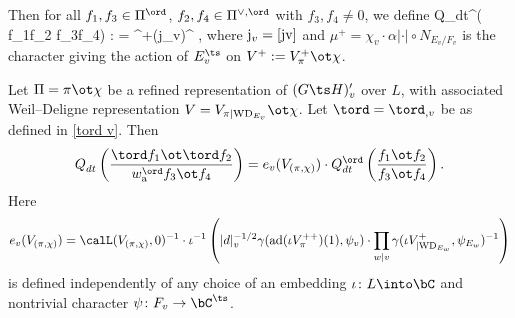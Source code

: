 Then for all $f_{1}, f_{3}\in \Pi^{\ord}$, $f_{2},f_{4}\in \Pi^{\vee, \ord}$ with $f_{3}, f_{4}\neq 0$, we define
\beq {}
Q_{dt}^{\ord}\left( {f_{1}\ot f_{2} \over f_{3}\ot f_{4}}\right)   : =  \mu^{+}({\rm j}_{v})^{} ,
\eeq
 where  ${\rm j}_{v}=\eqref{jv}$ and $\mu^{+}=\chi_{v}\cdot \alpha|\cdot|\circ N_{E_{v}/F_{v}}$ is the character giving the action of  $E_{v}^{\ts}$ on $V^{+}:=V_{\pi}^{+}\ot \chi$.




\begin{prop}
\notready {} Let $\Pi=\pi\ot\chi$ be a refined   representation of $(G\ts H)'_{v}$ over $L$, with associated Weil--Deligne representation $V=V_{\pi|{\rm WD}_{E_{v}}}\ot \chi$.  Let ${\tord}={\tord}_{,v}$ be as defined in \eqref{tord v}. Then
$$
 Q_{dt}^{}\left({ \tord f_{1}\ot \tord f_{2} \over w_{\rm a}^{\ord} f_{3}\ot f_{4}}\right) =  e_{v}(V_{(\pi, \chi)}) \cdot
 Q_{dt}^{\ord}\left( {f_{1}\ot f_{2} \over f_{3}\ot f_{4}}\right) . $$
Here $$  e_{v}(V_{(\pi, \chi)}) = \calL(V_{(\pi, \chi)}, 0)^{-1}\cdot
 \iota^{-1}\left( |d|_{v}^{-1/2} \gamma({\rm ad}(\iota V_{\pi}^{++})(1),  \psi_{v})\cdot \prod_{w\vert v} \gamma(\iota V^{+}_{|{\rm WD}_{E_{w}}}, \psi_{E_{w}})^{-1}\right)$$
is defined independently of  any choice of  an embedding $\iota\colon L\into \bC$ and nontrivial character $\psi\colon F_{v}\to \bC^{\ts}$.
\end{prop}
